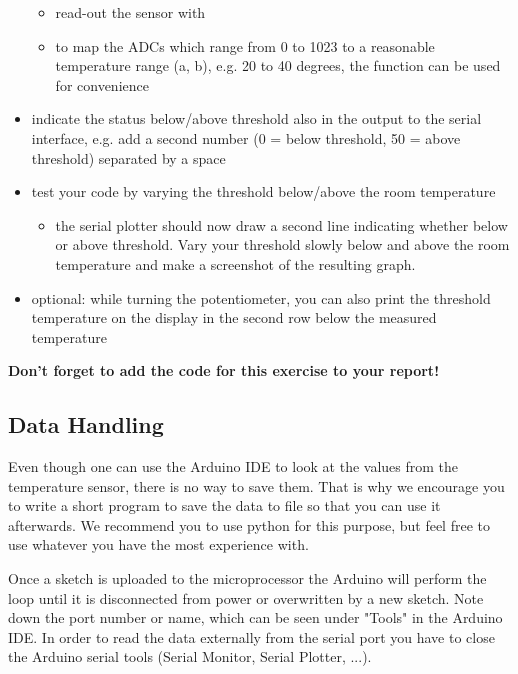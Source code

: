 \begin{itemize}
\begin{itemize}
        \item read-out the sensor with 
        \item to map the ADCs which range from 0 to 1023 to a reasonable temperature range (a, b), e.g. 20 to 40 degrees, the function  can be used for convenience
 	\end{itemize} 
 	\item indicate the status below/above threshold also in the output to the serial interface, e.g. add a second number (0 = below threshold, 50 = above threshold) separated by a space
    	\item test your code by varying the threshold below/above the room temperature
	\begin{itemize}
		\item the serial plotter should now draw a second line indicating whether below or above threshold. Vary your threshold slowly below and above the room temperature and make a screenshot of the resulting graph.
 	\end{itemize}
    	\item optional: while turning the potentiometer, you can also print the threshold temperature on the display in the second row below the measured temperature
\end{itemize}

\textbf{Don't forget to add the code for this exercise to your report!}

\subsection{Data Handling}\label{sec:data}
Even though one can use the Arduino \ac{IDE} to look at the values from the temperature sensor, there is no way to save them. That is why we encourage you to write a short program to save the data to file so that you can use it afterwards. We recommend you to use python for this purpose, but feel free to use whatever you have the most experience with.\par
Once a sketch is uploaded to the microprocessor the Arduino will perform the loop until it is disconnected from power or overwritten by a new sketch. Note down the port number or name, which can be seen under "Tools" in the Arduino IDE. In order to read the data externally from the serial port you have to close the Arduino serial tools (Serial Monitor, Serial Plotter, ...).\\


